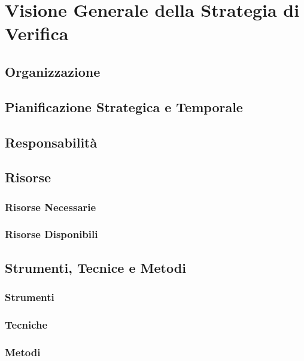 \section{Visione Generale della Strategia di Verifica}

\subsection{Organizzazione}

\subsection{Pianificazione Strategica e Temporale}

\subsection{Responsabilità}

\subsection{Risorse}
\subsubsection{Risorse Necessarie}
\subsubsection{Risorse Disponibili}

\subsection{Strumenti, Tecnice e Metodi}
\subsubsection{Strumenti}
\subsubsection{Tecniche}
\subsubsection{Metodi}